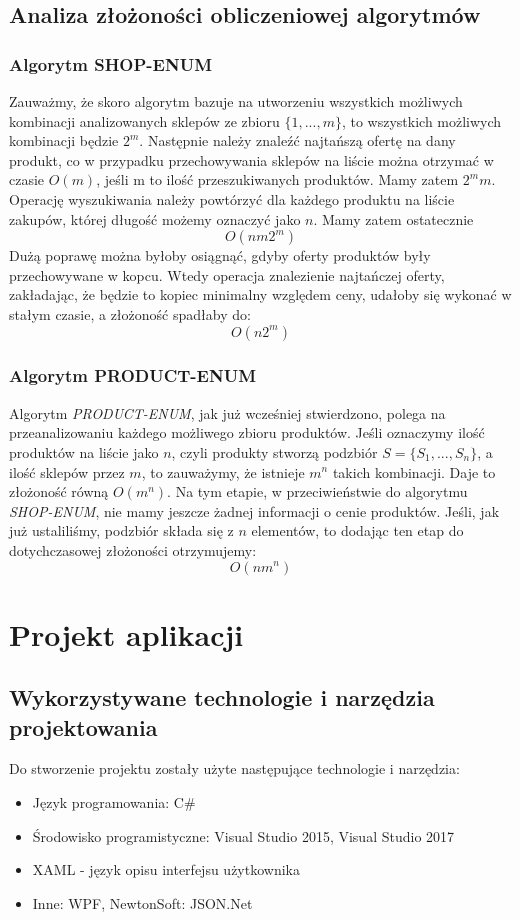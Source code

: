 \documentclass[a4paper]{article}
\let\oldsection\section
\renewcommand\section{\clearpage\oldsection}
\begin{document}
\subsection{Analiza złożoności obliczeniowej algorytmów}
\subsubsection{Algorytm SHOP-ENUM}
Zauważmy, że skoro algorytm bazuje na utworzeniu wszystkich możliwych kombinacji analizowanych sklepów ze zbioru $\{1,...,m\}$, to wszystkich możliwych kombinacji będzie $2^m$. Następnie należy znaleźć najtańszą ofertę na dany produkt, co w przypadku przechowywania sklepów na liście można otrzymać w czasie $O(m)$, jeśli m to ilość przeszukiwanych produktów. Mamy zatem $2^mm$. Operację wyszukiwania należy powtórzyć dla każdego produktu na liście zakupów, której długość możemy oznaczyć jako $n$. Mamy zatem ostatecznie
\begin{equation}
O(nm2^m)
\end{equation}
Dużą poprawę można byłoby osiągnąć, gdyby oferty produktów były przechowywane w kopcu. Wtedy operacja znalezienie najtańczej oferty, zakładając, że będzie to kopiec minimalny względem ceny, udałoby się wykonać w stałym czasie, a złożoność spadłaby do:
\begin{equation}
O(n2^m)
\end{equation}
\subsubsection{Algorytm PRODUCT-ENUM}
Algorytm \textit{PRODUCT-ENUM}, jak już wcześniej stwierdzono, polega na przeanalizowaniu każdego możliwego zbioru produktów. Jeśli oznaczymy ilość produktów na liście jako $n$, czyli produkty stworzą podzbiór $S = \{S_1,...,S_n\}$, a ilość sklepów przez $m$, to zauważymy, że istnieje $m^n$ takich kombinacji. Daje to złożoność równą $O(m^n)$. Na tym etapie, w przeciwieństwie do algorytmu \textit{SHOP-ENUM}, nie mamy jeszcze żadnej informacji o cenie produktów. Jeśli, jak już ustaliliśmy, podzbiór składa się z $n$ elementów, to dodając ten etap do dotychczasowej złożoności otrzymujemy:
\begin{equation}
O(nm^n)
\end{equation}
\section{Projekt aplikacji}
\subsection{Wykorzystywane technologie i narzędzia projektowania}
Do stworzenie projektu zostały użyte następujące technologie i narzędzia:
\begin{itemize}
\item Język programowania: C\#
\item Środowisko programistyczne: Visual Studio 2015, Visual Studio 2017
\item XAML - język opisu interfejsu użytkownika
\item Inne: WPF, NewtonSoft: JSON.Net
\end{itemize}
\end{document}
